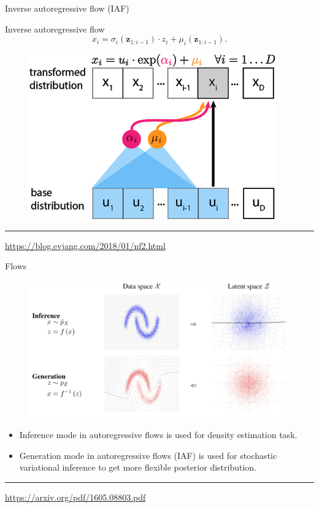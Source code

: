 \documentclass{beamer}
\newcommand{\bz}{\mathbf{z}}
\begin{document}
\begin{frame}{Inverse autoregressive flow (IAF)}
	\begin{minipage}[t]{0.65\columnwidth}
		\begin{block}{Inverse autoregressive flow}
			\[
			x_i = \sigma_i (\bz_{1:i-1}) \cdot z_i + \mu_i(\bz_{1:i-1}).
			\]
		\end{block}
	\end{minipage}%
	\begin{minipage}[t]{0.35\columnwidth}
		\begin{figure}[h]
			\centering
			\includegraphics[width=.9\linewidth]{figs/maf_iaf_explained_3.png}
		\end{figure}
	\end{minipage}
	
	\vspace{0.2cm}
	\vfill
	\hrule\medskip
	{\scriptsize \href{https://blog.evjang.com/2018/01/nf2.html}{https://blog.evjang.com/2018/01/nf2.html}} 
\end{frame}
\begin{frame}{Flows}
	\begin{figure}
		\includegraphics[width=0.8\linewidth]{figs/flows_how2.png}
	\end{figure}
	\begin{itemize}	
		\item Inference mode in autoregressive flows is used for density estimation task.
		\item Generation mode in autoregressive flows (IAF) is used for stochastic variational inference to get more flexible posterior distribution.
	\end{itemize}
	\vfill
	\hrule\medskip
	{\scriptsize \href{https://arxiv.org/pdf/1605.08803.pdf}{https://arxiv.org/pdf/1605.08803.pdf}} 
\end{frame}
\end{document}

